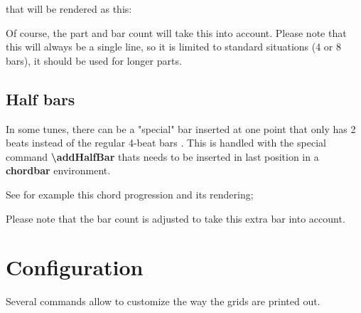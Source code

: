 \documentclass[11pt]{article}
\newcommand{\btt}{\bfseries \ttfamily }
\newcommand{\tbs}{\textbackslash{}}
\begin{document}
that will be rendered as this:


Of course, the part and bar count will take this into account.
Please note that this will always be a single line, so it is limited to standard situations (4 or 8 bars), it should be used for longer parts.

\subsection{Half bars}

In some tunes, there can be a "special" bar inserted at one point that only has 2 beats instead of the regular 4-beat bars .
This is handled with the special command {\btt \tbs addHalfBar} thats needs to be inserted in last position in a {\btt chordbar} environment.

See for example this chord progression and its rendering;



\resetchordbars
\countbarsYes


Please note that the bar count is adjusted to take this extra bar into account.

\section{Configuration}
\label{sec:config}

Several commands allow to customize the way the grids are printed out.
\end{document}
